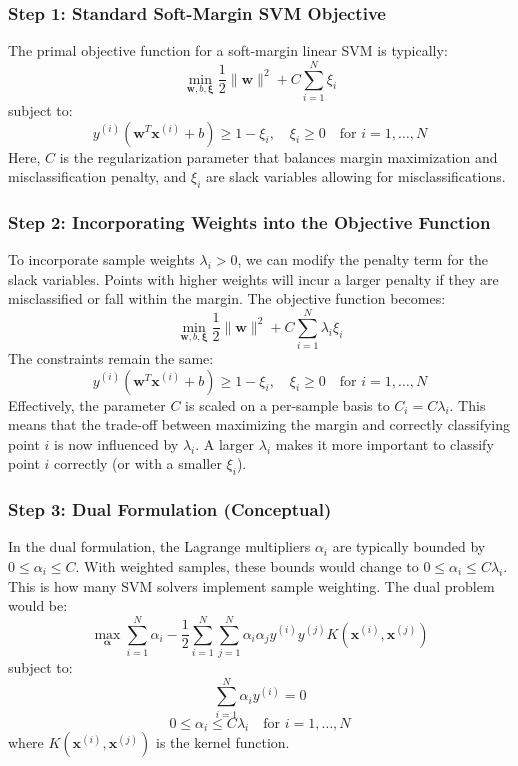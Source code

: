 \documentclass{article}
\begin{document}
\subsubsection*{Step 1: Standard Soft-Margin SVM Objective}
\parbox{\textwidth}{
The primal objective function for a soft-margin linear SVM is typically:
$$ \min_{\mathbf{w}, b, \boldsymbol{\xi}} \frac{1}{2} \|\mathbf{w}\|^2 + C \sum_{i=1}^{N} \xi_i $$
subject to:
$$ y^{(i)}(\mathbf{w}^T \mathbf{x}^{(i)} + b) \ge 1 - \xi_i, \quad \xi_i \ge 0 \quad \text{for } i=1, \ldots, N $$
Here, $C$ is the regularization parameter that balances margin maximization and misclassification penalty, and $\xi_i$ are slack variables allowing for misclassifications.
}

\subsubsection*{Step 2: Incorporating Weights into the Objective Function}
\parbox{\textwidth}{
To incorporate sample weights $\lambda_i > 0$, we can modify the penalty term for the slack variables. Points with higher weights will incur a larger penalty if they are misclassified or fall within the margin. The objective function becomes:
$$ \min_{\mathbf{w}, b, \boldsymbol{\xi}} \frac{1}{2} \|\mathbf{w}\|^2 + C \sum_{i=1}^{N} \lambda_i \xi_i $$
The constraints remain the same:
$$ y^{(i)}(\mathbf{w}^T \mathbf{x}^{(i)} + b) \ge 1 - \xi_i, \quad \xi_i \ge 0 \quad \text{for } i=1, \ldots, N $$
Effectively, the parameter $C$ is scaled on a per-sample basis to $C_i = C \lambda_i$. This means that the trade-off between maximizing the margin and correctly classifying point $i$ is now influenced by $\lambda_i$. A larger $\lambda_i$ makes it more important to classify point $i$ correctly (or with a smaller $\xi_i$).
}

\subsubsection*{Step 3: Dual Formulation (Conceptual)}
\parbox{\textwidth}{
In the dual formulation, the Lagrange multipliers $\alpha_i$ are typically bounded by $0 \le \alpha_i \le C$. With weighted samples, these bounds would change to $0 \le \alpha_i \le C \lambda_i$. This is how many SVM solvers implement sample weighting.
The dual problem would be:
$$ \max_{\boldsymbol{\alpha}} \sum_{i=1}^N \alpha_i - \frac{1}{2} \sum_{i=1}^N \sum_{j=1}^N \alpha_i \alpha_j y^{(i)} y^{(j)} K(\mathbf{x}^{(i)}, \mathbf{x}^{(j)}) $$
subject to:
$$ \sum_{i=1}^N \alpha_i y^{(i)} = 0 $$
$$ 0 \le \alpha_i \le C \lambda_i \quad \text{for } i=1, \ldots, N $$
where $K(\mathbf{x}^{(i)}, \mathbf{x}^{(j)})$ is the kernel function.
}
\end{document}
